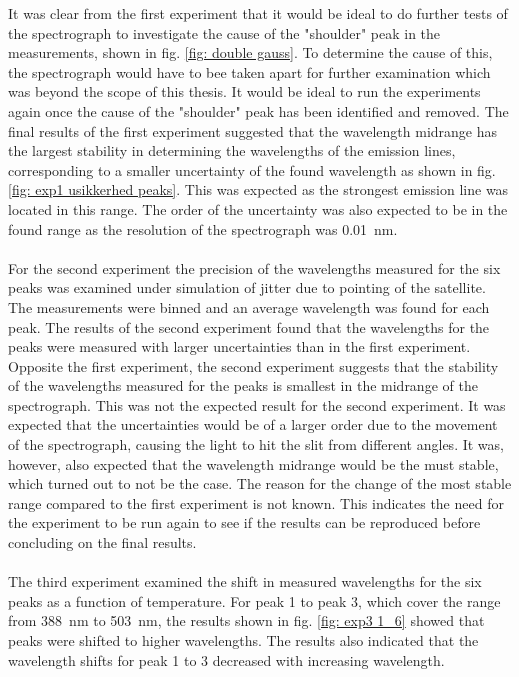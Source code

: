 It was clear from the first experiment that it would be ideal to do further tests of the spectrograph to investigate the cause of the "shoulder" peak in the measurements, shown in fig. \ref{fig: double gauss}. To determine the cause of this, the spectrograph would have to bee taken apart for further examination which was beyond the scope of this thesis. It would be ideal to run the experiments again once the cause of the "shoulder" peak has been identified and removed. 
The final results of the first experiment suggested that the wavelength midrange has the largest stability in determining the wavelengths of the emission lines, corresponding to a smaller uncertainty of the found wavelength as shown in fig. \ref{fig: exp1 usikkerhed peaks}. This was expected as the strongest emission line was located in this range. The order of the uncertainty was also expected to be in the found range as the resolution of the spectrograph was \SI{0.01}{nm}.
\\
\\
For the second experiment the precision of the wavelengths measured for the six peaks was examined under simulation of jitter due to pointing of the satellite. The measurements were binned and an average wavelength was found for each peak. The results of the second experiment found that the wavelengths for the peaks were measured with larger uncertainties than in the first experiment. Opposite the first experiment, the second experiment suggests that the stability of the wavelengths measured for the peaks is smallest in the midrange of the spectrograph. This was not the expected result for the second experiment. It was expected that the uncertainties would be of a larger order due to the movement of the spectrograph, causing the light to hit the slit from different angles. It was, however, also expected that the wavelength midrange would be the must stable, which turned out to not be the case. The reason for the change of the most stable range compared to the first experiment is not known.
This indicates the need for the experiment to be run again to see if the results can be reproduced before concluding on the final results. 
\\
\\
The third experiment examined the shift in measured wavelengths for the six peaks as a function of temperature. For peak 1 to peak 3, which cover the range from \SI{388}{\nano\meter} to \SI{503}{\nano\meter}, the results shown in fig. \ref{fig: exp3 1_6} showed that peaks were shifted to higher wavelengths. The results also indicated that the wavelength shifts for peak 1 to 3 decreased with increasing wavelength.
